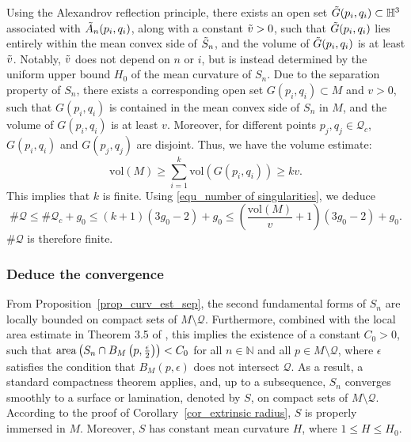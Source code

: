 \documentclass[12pt,a4paper]{amsart}
\numberwithin{equation}{section}
\theoremstyle{plain}
\theoremstyle{named}
\theoremstyle{definition}
\newcommand{\area}{{\rm{area}}}
\begin{document}
     Using the Alexandrov reflection principle, there exists an open set $\Tilde{G}(p_i,q_i)\subset \mathbb{H}^3$ associated with $\Tilde{A}_n(p_i,q_i)$, along with a constant $\Tilde{v}>0$, such that $\Tilde{G}(p_i,q_i)$ lies entirely within the mean convex side of $\Tilde{S}_n$, and the volume of $\Tilde{G}(p_i,q_i)$ is at least $\Tilde{v}$. Notably, $\Tilde{v}$ does not depend on $n$ or $i$, but is instead determined by the uniform upper bound $H_0$ of the mean curvature of $S_n$. Due to the separation property of $S_n$, there exists a corresponding open set $G(p_i,q_i)\subset M$ and $v>0$, such that $G(p_i,q_i)$ is contained in the mean convex side of $S_n$ in $M$, and the volume of $G(p_i,q_i)$ is at least $v$. Moreover, for different points $p_j,q_j\in\mathcal{Q}_c$, $G(p_i,q_i)$ and $G(p_j,q_j)$ are disjoint. Thus, we have the volume estimate:
     \begin{equation}\label{equ_volume_lower}
         \text{vol}(M)\geq \sum_{i=1}^k\text{vol}(G(p_i,q_i))\geq kv.
     \end{equation}
     This implies that $k$ is finite. Using \eqref{equ_number of singularities}, we deduce \begin{equation*}
         \#\mathcal{Q}\leq\#\mathcal{Q}_c+g_0\leq (k+1)(3g_0-2)+g_0\leq \left(\frac{\text{vol}(M)}{v}+1\right)(3g_0-2)+g_0.
     \end{equation*}
     $\#\mathcal{Q}$ is therefore finite.
     

    \subsubsection{Deduce the convergence}
    
     From Proposition~\ref{prop_curv_est_sep}, the second fundamental forms of $S_n$ are locally bounded on compact sets of $M\setminus\mathcal{Q}$. Furthermore, combined with the local area estimate in Theorem 3.5 of \cite{Meeks-Tinaglia_epsilon-nbhd}, this implies the existence of a constant $C_0>0$, such that $\area\left(S_n\cap B_M\left(p,\frac{\epsilon}{2}\right)\right)<C_0$ for all $n\in\mathbb{N}$ and all $p\in M\setminus\mathcal{Q}$, where $\epsilon$ satisfies the condition that $B_M(p,\epsilon)$ does not intersect $\mathcal{Q}$. As a result, a standard compactness theorem applies, and, up to a subsequence, $S_n$ converges smoothly to a surface or lamination, denoted by $S$, on compact sets of $M\setminus\mathcal{Q}$. According to the proof of Corollary~\ref{cor_extrinsic radius}, $S$ is properly immersed in $M$. Moreover, $S$ has constant mean curvature $H$, where $1\leq H\leq H_0$. 
\end{document}
